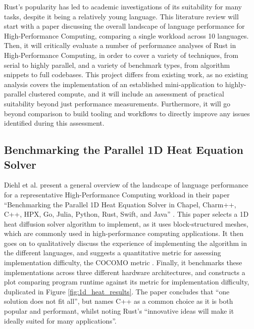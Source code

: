 Rust's popularity has led to academic investigations of its suitability for many tasks, despite it being a relatively young language. This literature review will start with a paper discussing the overall landscape of language performance for High-Performance Computing, comparing a single workload across 10 languages. Then, it will critically evaluate a number of performance analyses of Rust in High-Performance Computing, in order to cover a variety of techniques, from serial to highly parallel, and a variety of benchmark types, from algorithm snippets to full codebases. This project differs from existing work, as no existing analysis covers the implementation of an established mini-application to highly-parallel clustered compute, and it will include an assessment of practical suitability beyond just performance measurements. Furthermore, it will go beyond comparison to build tooling and workflows to directly improve any issues identified during this assessment.

\subsection{Benchmarking the Parallel 1D Heat Equation Solver}
\label{ssec:diehl-et-al}

Diehl et al. present a general overview of the landscape of language performance for a representative High-Performance Computing workload in their paper ``Benchmarking the Parallel 1D Heat Equation Solver in Chapel, Charm++, C++, HPX, Go, Julia, Python, Rust, Swift, and Java'' \cite{diehlBenchmarkingParallel1D2023}. This paper selects a 1D heat diffusion solver algorithm to implement, as it uses block-structured meshes, which are commonly used in high-performance computing applications. It then goes on to qualitatively discuss the experience of implementing the algorithm in the different languages, and suggests a quantitative metric for assessing implementation difficulty, the COCOMO metric \cite{boehm1995cost}. Finally, it benchmarks these implementations across three different hardware architectures, and constructs a plot comparing program runtime against its metric for implementation difficulty, duplicated in Figure \ref{fig:1d_heat_results}. The paper concludes that ``one solution does not fit all'', but names C++ as a common choice as it is both popular and performant, whilst noting Rust's ``innovative ideas will make it ideally suited for many applications''.

